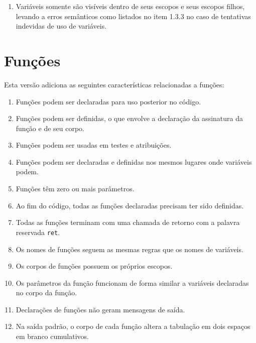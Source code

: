 \documentclass{sftex/sftex}
\newenvironment{smallenum}{
    \vspace{-1mm}
    \begin{enumerate}[label=\roman*.]
    \setlength{\parskip}{0pt}
    \setlength{\itemsep}{2pt}
}{
    \vspace{-2mm}
    \end{enumerate}
}
\begin{document}
\begin{smallenum}

\item Variáveis somente são visíveis dentro de seus escopos e seus escopos
    filhos, levando a erros semânticos como listados no item 1.3.3 no caso
    de tentativas indevidas de uso de variáveis.

\end{smallenum}

\section{Funções}

Esta versão adiciona as seguintes características relacionadas a funções:

\begin{smallenum}

\item Funções podem ser declaradas para uso posterior no código.

\item Funções podem ser definidas, o que envolve a declaração da assinatura da
    função e de seu corpo.

\item Funções podem ser usadas em testes e atribuições.

\item Funções podem ser declaradas e definidas nos mesmos lugares onde
    variáveis podem.

\item Funções têm zero ou mais parâmetros.

\item Ao fim do código, todas as funções declaradas precisam ter sido
    definidas.

\item Todas as funções terminam com uma chamada de retorno com a palavra
    reservada \verb!ret!.

\item Os nomes de funções seguem as mesmas regras que os nomes de variáveis.

\item Os corpos de funções possuem os próprios escopos.

\item Os parâmetros da função funcionam de forma similar a variáveis
    declaradas no corpo da função.

\item Declarações de funções não geram mensagens de saída.

\item Na saída padrão, o corpo de cada função altera a tabulação em dois
    espaços em branco cumulativos.

\end{smallenum}
\end{document}
